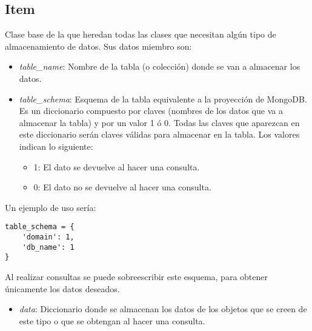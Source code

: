 \subsection{Item}

Clase base de la que heredan todas las clases que necesitan algún tipo de almacenamiento de datos. Sus datos miembro son:
\begin{itemize}
	\item \textit{table\_name}: Nombre de la tabla (o colección) donde se van a almacenar los datos.
	\item \textit{table\_schema}: Esquema de la tabla equivalente a la proyección de MongoDB. Es un diccionario compuesto por claves (nombres de los datos que va a almacenar la tabla) y por un valor 1 ó 0. Todas las claves que aparezcan en este diccionario serán claves válidas para almacenar en la tabla. Los valores indican lo siguiente:
	\begin{itemize}
		\item 1: El dato se devuelve al hacer una consulta.
		\item 0: El dato no se devuelve al hacer una consulta.
	\end{itemize}
\end{itemize}

\bigskip
Un ejemplo de uso sería:

\begin{lstlisting}
table_schema = {
	'domain': 1,
	'db_name': 1
}
\end{lstlisting}

\bigskip
Al realizar consultas  se puede sobreescribir este esquema, para obtener únicamente los datos deseados.
\begin{itemize}
	\item \textit{data}: Diccionario donde se almacenan los datos de los objetos que se creen de este tipo o que se obtengan al hacer una consulta.
\end{itemize}


